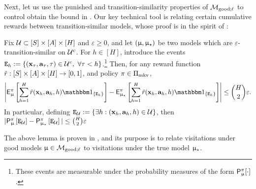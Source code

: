 Next, let us use the punished and transition-similarity properties of $\mathcal{M}_{\mathrm{good};\ell}$ to control obtain the bound in . Our key technical tool is relating certain cumulative rewards between transition-similar models, whose proof is in the spirit of \cite{kearns2002near}:

\newcommand{\Evisitnol}{\scrE_{\calU}}
\newcommand{\omegast}{\omega_{\star}}
\begin{lemma}\label{lem:visitation_comparison_general}
Fix $\mathcal{U} \subset [S] \times [A] \times [H]$ and $\varepsilon \ge 0$, and let $(\upmu,\upmu_{\star})$ be two models which are $\varepsilon$-transition-similar on $\mathcal{U}^c$.  For $h \in [H]$, introduce the events $\texttt{E}_h := \{(\mathbf{x}_\tau,\mathbf{a}_{\tau},\tau) \in \mathcal{U}^c,~ \forall \tau < h\}$.\footnote{These events are measurable under the probability measures of the form $\mathsf{P}^{\pi}_{\upmu}[\cdot]$. } Then, for any reward function $\tilde{r}: [S] \times [A] \times [H] \to [0,1]$, and policy $\pi \in \Pi_{\mathrm{mkv}}$,
\begin{align*}
\left|\sfE^{\pi}_{\model}\left[\sum_{h=1}^H \rtil(\bmx_h,\bma_h,h) \ind_{\{\scrE_h\}}\right] - \sfE^{\pi}_{\modst}\left[\sum_{h=1}^H\rtil(\bmx_h,\bma_h,h) \ind_{\{\scrE_h\}}\right]\right| \le \binom{H}{2}\varepsilon.
\end{align*}
In particular, defining $\Evisitnol := \{\exists h : (\bmx_h,\bma_{h},h) \in \calU\}$, then $|\sfP^{\pi}_{\model}\left[\Evisitnol \right] - \sfP^{\pi}_{\modst}\left[\Evisitnol \right]| \le \binom{H}{2}\varepsilon$
\end{lemma}
The above lemma is proven in , and its purpose is to relate visitations under good models $\upmu \in \mathcal{M}_{\mathrm{good};\ell}$ to visitations under the true model $\upmu_{\star}$.

